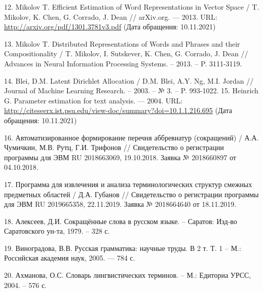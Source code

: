 \documentclass[fleqn, a4paper,12pt]{article}
\begin{document}
12. Mikolov T. Efficient Estimation of Word Representations in Vector Space / T. Mikolov, K. Chen, G. Corrado, J. Dean // arXiv.org. — 2013. URL: \url{http://arxiv.org/pdf/1301.3781v3.pdf} (Дата обращения: 10.11.2021)

13. Mikolov T. Distributed Representations of Words and Phrases and their
\\Compositionality / T. Mikolov, I. Sutskever, K. Chen, G. Corrado, J. Dean // Advances in Neural Information Processing Systems. – 2013. – P. 3111-3119.

14. Blei, D.M. Latent Dirichlet Allocation / D.M. Blei, A.Y. Ng, M.I. Jordan // Journal of Machine Learning Research. – 2003. – № 3. – P. 993-1022.
15. Heinrich G. Parameter estimation for text analysis. — 2004. URL: \url{http://citeseerx.ist.psu.edu/view-doc/summary?doi=10.1.1.216.695} (Дата обращения: 10.11.2021)

16. Автоматизированное формирование перечня аббревиатур (сокращений) / А.А. Чумичкин, М.В. Рутц, Г.И. Трифонов // Свидетельство о регистрации программы для ЭВМ RU 2018663069, 19.10.2018. Заявка № 2018660897 от 04.10.2018.

17. Программа для извлечения и анализа терминологических структур смежных предметных областей / Д.А. Губанов // Свидетельство о регистрации программы для ЭВМ RU 2019665358, 22.11.2019. Заявка № 2018664640 от 18.11.2019.

18.  Алексеев, Д.И. Сокращённые слова в русском языке. – Саратов: Изд-во Саратовского ун-та, 1979. – 328 с.

19.  Виноградова, В.В. Русская грамматика: научные труды. В 2 т. Т. 1 – М.: Российская академия наук, 2005. — 784 с.

20. Ахманова, О.С. Словарь лингвистических терминов. – М.: Едиториа УРСС, 2004. – 576 с.
\end{document}
